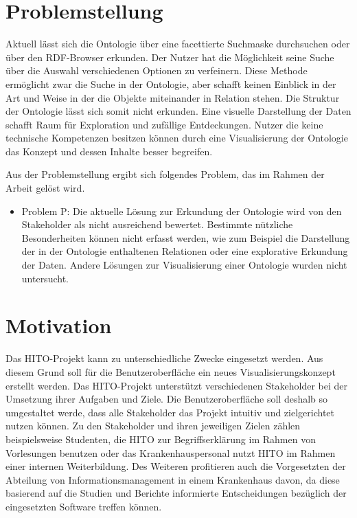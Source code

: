 \section{Problemstellung}\label{sec:problemstellung}

Aktuell lässt sich die Ontologie über eine facettierte Suchmaske durchsuchen oder über den RDF-Browser erkunden. 
Der Nutzer hat die Möglichkeit seine Suche über die Auswahl verschiedenen Optionen zu verfeinern.
Diese Methode ermöglicht zwar die Suche in der Ontologie, aber schafft keinen Einblick in der Art und Weise in der die Objekte miteinander in Relation stehen.
Die Struktur der Ontologie lässt sich somit nicht erkunden.
Eine visuelle Darstellung der Daten schafft Raum für Exploration und zufällige Entdeckungen. 
Nutzer die keine technische Kompetenzen besitzen können durch eine Visualisierung der Ontologie das Konzept und dessen Inhalte besser begreifen. \citep[vgl.]{linkeddatavisualization} \newline
\newline

Aus der Problemstellung ergibt sich folgendes Problem, das im Rahmen der Arbeit gelöst wird.

\begin{itemize}
\item Problem P: Die aktuelle Lösung zur Erkundung der Ontologie wird von den Stakeholder als nicht ausreichend bewertet.
Bestimmte nützliche Besonderheiten können nicht erfasst werden, wie zum Beispiel die Darstellung der in der Ontologie enthaltenen Relationen oder eine explorative Erkundung der Daten. 
Andere Lösungen zur Visualisierung einer Ontologie wurden nicht untersucht.
\end{itemize}

\section{Motivation}\label{sec:motivation}

Das HITO-Projekt kann zu unterschiedliche Zwecke eingesetzt werden. 
Aus diesem Grund soll für die Benutzeroberfläche ein neues Visualisierungskonzept erstellt werden. 
Das HITO-Projekt unterstützt verschiedenen Stakeholder bei der Umsetzung ihrer Aufgaben und Ziele.
Die Benutzeroberfläche soll deshalb so umgestaltet werde, dass alle Stakeholder das Projekt intuitiv und zielgerichtet nutzen können.
Zu den Stakeholder und ihren jeweiligen Zielen zählen beispielsweise Studenten, die HITO zur Begriffserklärung im Rahmen von Vorlesungen benutzen oder das Krankenhauspersonal nutzt HITO im Rahmen einer internen Weiterbildung. 
Des Weiteren profitieren auch die Vorgesetzten der Abteilung von Informationsmanagement in einem Krankenhaus davon, da diese basierend auf die Studien und Berichte informierte Entscheidungen bezüglich der eingesetzten Software treffen können. 

